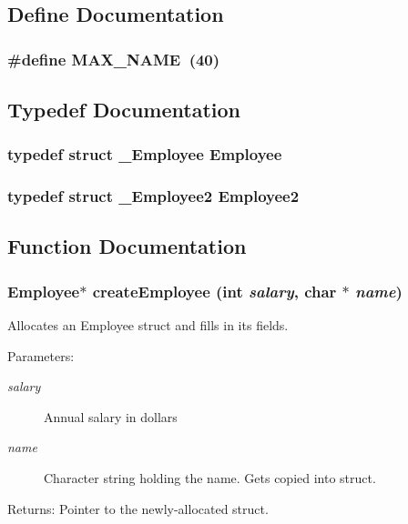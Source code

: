 \subsection{Define Documentation}
\subsubsection{\setlength{\rightskip}{0pt plus 5cm}\#define MAX\_\-NAME~(40)}\label{etest_8h_c7c0207aa5a0e10d378be03b68041350}




\subsection{Typedef Documentation}
\subsubsection{\setlength{\rightskip}{0pt plus 5cm}typedef struct \bf{\_\-Employee} \bf{Employee}}\label{etest_8h_f86d012563975d4da5c22487e31948e2}


\subsubsection{\setlength{\rightskip}{0pt plus 5cm}typedef struct \bf{\_\-Employee2} \bf{Employee2}}\label{etest_8h_1e28080f01f9a4f4aba612c98c17b1e5}




\subsection{Function Documentation}
\subsubsection{\setlength{\rightskip}{0pt plus 5cm}\bf{Employee}$\ast$ create\-Employee (int {\em salary}, char $\ast$ {\em name})}\label{etest_8h_eb7cb4c5c4779c2113e3daf270db2345}


Allocates an Employee struct and fills in its fields. \begin{Desc}
\item[Parameters:]
\begin{description}
\item[{\em salary}]Annual salary in dollars \item[{\em name}]Character string holding the name. Gets copied into struct. \end{description}
\end{Desc}
\begin{Desc}
\item[Returns:]Pointer to the newly-allocated struct. \end{Desc}
